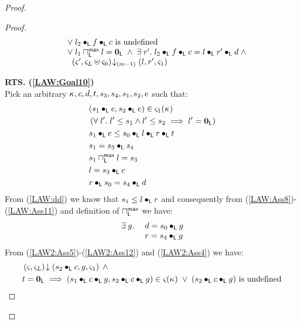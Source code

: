 \begin{lemma}[]
\begin{proof}
\begin{proof}
\begin{align}
\begin{array}{l}
		\hspace*{0.4cm}\lor\;l_2 \bullet_{\textsf{L}} f \bullet_{\textsf{L}} c \text{ is undefined}\\
		\hspace*{0.4cm}\lor\; l_1 \sqcap_{\textsf{L}}^{\textsf{max}} l = \mathbf{0}_{\textsf{L}} \;\land\; \exists\; r'.\; l_2 \bullet_{\textsf{L}} f \bullet_{\textsf{L}} c = l \bullet_{\textsf{L}} r' \bullet_{\textsf{L}} d \;\land\\
		\hspace*{0.6cm} \left(\varsigma_{}', \varsigma_{L} \uplus \varsigma_{0}\right) \!\downarrow_{(m-1)} \left(l, r', \varsigma_{1}\right)
	\end{array} \label{LAW:Goal11}
\end{align}
%

\noindent\textbf{RTS. (\ref{LAW:Goal10})} \\
Pick an arbitrary $\kappa_{}, c, d, t, s_3, s_4, s_1, s_2, e$ such that:
%
\begin{align}
	& (s_1 \bullet_{\textsf{L}} e, s_2 \bullet_{\textsf{L}} e) \in \varsigma_{1}(\kappa_{}) \label{LAW2:Ass5} \\
	& \left(\forall\; l'.\; l' \leq s_1 \land l' \leq s_2 \implies l' = \mathbf{0}_{\textsf{L}}\right) \label{LAW:Ass6}\\
	& s_1 \bullet_{\textsf{L}} e \leq  s_0 \bullet_{\textsf{L}} l \bullet_{\textsf{L}} r \bullet_{\textsf{L}} t\label{LAW2:Ass7}\\
	& s_1 = s_3 \bullet_{\textsf{L}} s_4 \label{LAW2:Ass8}\\
	& s_1 \sqcap_{\textsf{L}}^{\textsf{max}} l = s_3 \label{LAW2:Ass9}\\
	& l = s_3 \bullet_{\textsf{L}} c \label{LAW2:Ass10}\\
	& r \bullet_{\textsf{L}} s_0 = s_4 \bullet_{\textsf{L}} d \label{LAW2:Ass11}
\end{align}
From (\ref{LAW:dd}) we know that $s_1 \leq l \bullet_{\textsf{L}} r$ and consequently from (\ref{LAW:Ass8})-(\ref{LAW:Ass11}) and definition of $\sqcap_{\textsf{L}}^{\textsf{max}}$ we have:
%
\begin{align}
\begin{array}{l l}
	\exists\; g.\; & d = s_0 \bullet_{\textsf{L}} g \\
	& r = s_4 \bullet_{\textsf{L}} g
\end{array} \label{LAW2:Ass12}
\end{align}
From (\ref{LAW2:Ass5})-(\ref{LAW2:Ass12}) and (\ref{LAW2:Ass4}) we have:
%
\begin{align}
	&\left(\varsigma_{}, \varsigma_{L}\right) \!\downarrow \left(s_2 \bullet_{\textsf{L}} c, g, \varsigma_{1}\right) \;\land \nonumber\\
	&t = \mathbf{0}_{\textsf{L}} \implies (s_1 \bullet_{\textsf{L}} c \bullet_{\textsf{L}} g, s_2 \bullet_{\textsf{L}} c \bullet_{\textsf{L}} g) \in \varsigma_{}(\kappa_{}) \;\lor\; (s_2 \bullet_{\textsf{L}} c \bullet_{\textsf{L}} g) \text{ is undefined} \label{LAW2:Assmid}
\end{align}

\end{proof}
\end{proof}
\end{lemma}
